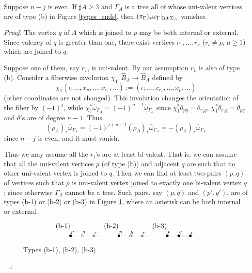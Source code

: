 \begin{lem}\label{hidden_2}
Suppose $n-j$ is even.
If $\sharp A \ge 3$ and $\Gamma_A$ is a tree all of whose uni-valent vertices are of type (b) in Figure \ref{types_ends},
then $(\pi_{\Gamma})_* \omega_{\Gamma}|_{\mathrm{Int}\, \Sigma_A}$ vanishes.
\end{lem}


\begin{proof}
The vertex $q$ of $A$ which is joined to $p$ may be both internal or external.
Since valency of $q$ is greater than one, there exist vertices $r_1 ,\dots ,r_a$ ($r_i \ne p$, $a \ge 1$) which are
joined to $q$.


Suppose one of them, say $r_1$, is uni-valent.
By our assumption $r_1$ is also of type (b).
Consider a fiberwise involution $\chi_1 : \hat{B}_A \to \hat{B}_A$ defined by
\[
 \chi_1 (\iota ; \dots ,x_p , \dots ,x_{r_1},\dots ) := (\iota ; \dots ,x_{r_1}, \dots ,x_p ,\dots )
\]
(other coordinates are not changed).
This involution changes the orientation of the fiber by $(-1)^j$, while
$\chi_1^* \hat{\omega}_{\Gamma_A}=(-1)^{n-1}\hat{\omega}_{\Gamma_A}$ since $\chi^*_1 \theta_{pq}=\theta_{r_1 q}$,
$\chi^*_1 \theta_{r_1 q}=\theta_{pq}$ and $\theta$'s are of degree $n-1$.
Thus
\[
 (\rho_A )_* \hat{\omega}_{\Gamma_A} =(-1)^{j+n-1}(\rho_A )_* \hat{\omega}_{\Gamma_A}
 =-(\rho_A )_* \hat{\omega}_{\Gamma_A}
\]
since $n-j$ is even, and it must vanish.


Thus we may assume all the $r_i$'s are at least bi-valent.
That is, we can assume that all the uni-valent vertices $p$ (of type (b)) and adjacent $q$ are such that no other
uni-valent vertex is joined to $q$.
Then we can find at least two pairs $(p,q)$ of vertices such that $p$ is uni-valent vertex joined to exactly one
bi-valent vertex $q$; since otherwise $\Gamma_A$ cannot be a tree.
Such pairs, say $(p,q)$ and $(p' ,q' )$, are of types (b-1) or (b-2) or (b-3) in Figure \ref{fig_b1}, where an asterisk
can be both internal or external.
\begin{figure}[htb]%
\[
 \begin{xy}
 (-4,5)*{\text{(b-1)}},
 (0,0)*{\bullet}="A",(6,0)*{\circ}="B",(12,0)*{*}="C",
 {\ar@{.}"A";"B"^<{p}},{\ar@{.}"B";"C"^<{q}},{\ar@{.}"C";(15,0)^<{r}},
 (21,5)*{\text{(b-2)}},
 (25,0)*{\bullet}="D",(31,0)*{\circ}="E",(37,0)*{*}="F",
 {\ar@{.}"D";"E"^<{p}},{\ar@{.}"E";"F"^<{q}},{\ar@{.}"F";(40,0)^<{r}},
 (46,5)*{\text{(b-3)}},
 (50,0)*{\bullet}="G",(56,0)*{\bullet}="H",(62,0)*{\bullet}="I",
 {\ar@{.}"G";"H"^<{p}},{\ar@{-}"H";"I"^<{q}},{\ar@{.}"I";(65,0)^<{r}}
 \end{xy}
\]
\caption{Types (b-1), (b-2), (b-3)}\label{fig_b1}
\end{figure}



\end{proof}
